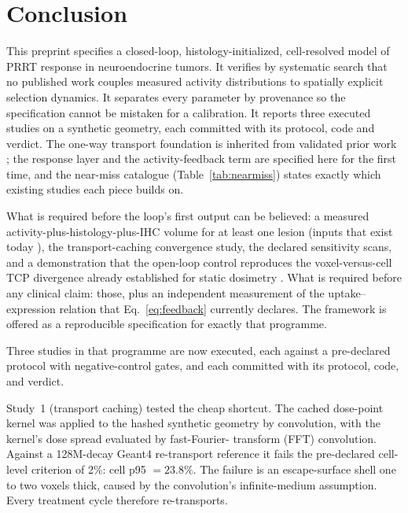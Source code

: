 \documentclass[11pt]{article}
\begin{document}
\section{Conclusion}

This preprint specifies a closed-loop, histology-initialized, cell-resolved model of PRRT response in neuroendocrine
tumors. It verifies by systematic search that no published work couples measured activity distributions to spatially
explicit selection dynamics. It separates every parameter by provenance so the specification cannot be mistaken for a
calibration. It reports three executed studies on a synthetic geometry, each committed with
its protocol, code and verdict. The one-way transport foundation is
inherited from validated prior work \cite{kinder2026biofilm}; the response layer and the
activity-feedback term are specified here for the first time, and the near-miss catalogue
(Table~\ref{tab:nearmiss}) states exactly which existing studies each piece builds on.

What is required before the loop's first output can be believed: a measured
activity-plus-histology-plus-IHC volume for at least one lesion (inputs that exist today
\cite{sahota2025,mellhammar2023}), the transport-caching convergence study, the declared
sensitivity scans, and a demonstration that the open-loop control reproduces the
voxel-versus-cell TCP divergence already established for static dosimetry
\cite{mellhammar2023}. What is required before any clinical claim: those, plus an
independent measurement of the uptake--expression relation that Eq.~\ref{eq:feedback}
currently declares. The framework is offered as a reproducible specification for exactly
that programme.

Three studies in that programme are now executed, each against a pre-declared
protocol with negative-control gates, and each committed with its protocol,
code, and verdict.

Study~1 (transport caching) tested the cheap shortcut. The cached
dose-point kernel was applied to the hashed synthetic geometry by
convolution, with the kernel's dose spread evaluated by fast-Fourier-
transform (FFT) convolution. Against a 128M-decay Geant4 re-transport
reference it fails the pre-declared cell-level criterion of 2\%:
cell p95 $= 23.8\%$. The failure is an escape-surface shell one to two
voxels thick, caused by the convolution's infinite-medium assumption.
Every treatment cycle therefore re-transports.
\end{document}
